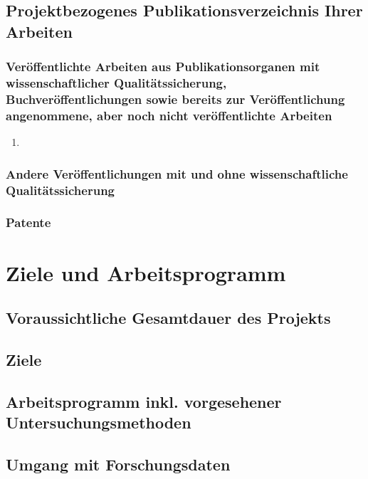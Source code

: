 \documentclass[de]{dfg-proposal}
\begin{document}
        \subsection{Projektbezogenes Publikationsverzeichnis Ihrer Arbeiten}

            \subsubsection{Veröffentlichte Arbeiten aus Publikationsorganen mit wissenschaftlicher Qualitätssicherung, Buchveröffentlichungen sowie bereits zur Veröffentlichung angenommene, aber noch nicht veröffentlichte Arbeiten}

                \begin{enumerate}
                    \item~
                \end{enumerate}

            \subsubsection{Andere Veröffentlichungen mit und ohne wissenschaftliche Qualitätssicherung}

            \subsubsection{Patente}


    \section{Ziele und Arbeitsprogramm}\label{sec:ziele-und-arbeitsprogramm}

        \subsection{Voraussichtliche Gesamtdauer des Projekts}

        \subsection{Ziele}

        \subsection{Arbeitsprogramm inkl. vorgesehener Untersuchungsmethoden}

        \subsection{Umgang mit Forschungsdaten}
\end{document}
